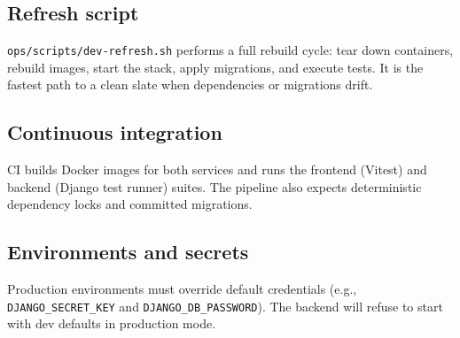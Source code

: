\subsection{Refresh script}
\label{subsec:ops:refresh}

\texttt{ops/scripts/dev-refresh.sh} performs a full rebuild cycle: tear down containers, rebuild images, start the stack, apply migrations, and execute tests. It is the fastest path to a clean slate when dependencies or migrations drift.

\subsection{Continuous integration}
\label{subsec:ops:ci}

CI builds Docker images for both services and runs the frontend (Vitest) and backend (Django test runner) suites. The pipeline also expects deterministic dependency locks and committed migrations.

\subsection{Environments and secrets}
\label{subsec:ops:secrets}

Production environments must override default credentials (e.g., \texttt{DJANGO\_SECRET\_KEY} and \texttt{DJANGO\_DB\_PASSWORD}). The backend will refuse to start with dev defaults in production mode.
